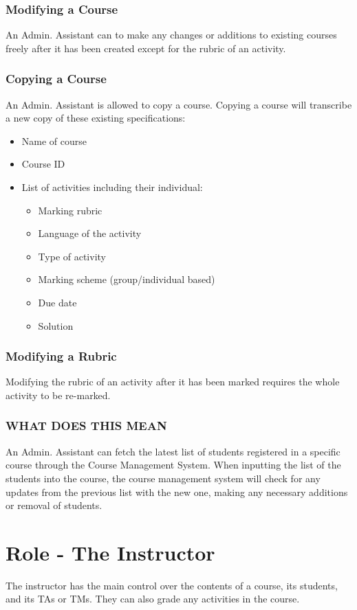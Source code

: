 \documentclass{article}
\begin{document}
\subsubsection{Modifying a Course}
An Admin. Assistant can to make any changes or additions to existing courses
freely after it has been created except for the rubric of an activity.
\subsubsection{Copying a Course}
An Admin. Assistant is allowed to copy a course. Copying a course will transcribe a new copy of these existing specifications:
\begin{itemize}
  \item Name of course
  \item Course ID
  \item List of activities including their individual:
    \begin{itemize}
    \item Marking rubric
    \item Language of the activity
    \item Type of activity
    \item Marking scheme (group/individual based)
    \item Due date
    \item Solution
    \end {itemize}
\end {itemize}
\subsubsection{Modifying a Rubric}
Modifying the rubric of an activity after it has been marked requires the whole
activity to be re-marked.

\subsubsection{WHAT DOES THIS MEAN}
An Admin. Assistant can fetch the latest list of students registered in a
specific course through the Course Management System.
When inputting the list of the students into the course, the course management
system will check for any updates from the previous list with the new one,
making any necessary additions or removal of students.



\section{Role - The Instructor}
The instructor has the main control over the contents of a course, its students, 
and its TAs or TMs. They can also grade any activities in the course.
\end{document}
